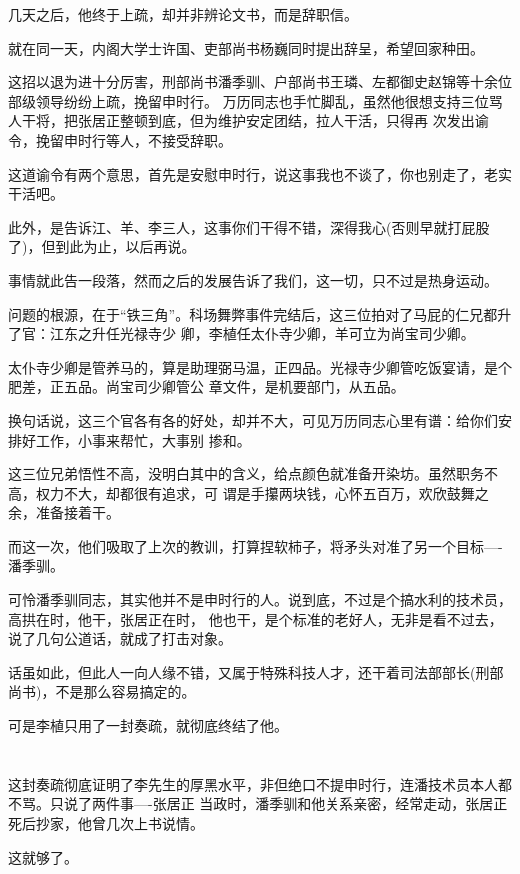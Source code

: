 \documentclass[11pt,a4paper,onecolumn]{article}
\begin{document}
几天之后，他终于上疏，却并非辨论文书，而是辞职信。

就在同一天，内阁大学士许国、吏部尚书杨巍同时提出辞呈，希望回家种田。

这招以退为进十分厉害，刑部尚书潘季驯、户部尚书王璘、左都御史赵锦等十余位部级领导纷纷上疏，挽留申时行。
万历同志也手忙脚乱，虽然他很想支持三位骂人干将，把张居正整顿到底，但为维护安定团结，拉人干活，只得再
次发出谕令，挽留申时行等人，不接受辞职。

这道谕令有两个意思，首先是安慰申时行，说这事我也不谈了，你也别走了，老实干活吧。

此外，是告诉江、羊、李三人，这事你们干得不错，深得我心(否则早就打屁股了)，但到此为止，以后再说。

事情就此告一段落，然而之后的发展告诉了我们，这一切，只不过是热身运动。

问题的根源，在于``铁三角''。科场舞弊事件完结后，这三位拍对了马屁的仁兄都升了官：江东之升任光禄寺少
卿，李植任太仆寺少卿，羊可立为尚宝司少卿。

太仆寺少卿是管养马的，算是助理弼马温，正四品。光禄寺少卿管吃饭宴请，是个肥差，正五品。尚宝司少卿管公
章文件，是机要部门，从五品。

换句话说，这三个官各有各的好处，却并不大，可见万历同志心里有谱：给你们安排好工作，小事来帮忙，大事别
掺和。

这三位兄弟悟性不高，没明白其中的含义，给点颜色就准备开染坊。虽然职务不高，权力不大，却都很有追求，可
谓是手攥两块钱，心怀五百万，欢欣鼓舞之余，准备接着干。

而这一次，他们吸取了上次的教训，打算捏软柿子，将矛头对准了另一个目标----潘季驯。

可怜潘季驯同志，其实他并不是申时行的人。说到底，不过是个搞水利的技术员，高拱在时，他干，张居正在时，
他也干，是个标准的老好人，无非是看不过去，说了几句公道话，就成了打击对象。

话虽如此，但此人一向人缘不错，又属于特殊科技人才，还干着司法部部长(刑部尚书)，不是那么容易搞定的。

可是李植只用了一封奏疏，就彻底终结了他。

\section[\thesection]{}

这封奏疏彻底证明了李先生的厚黑水平，非但绝口不提申时行，连潘技术员本人都不骂。只说了两件事----张居正
当政时，潘季驯和他关系亲密，经常走动，张居正死后抄家，他曾几次上书说情。

这就够了。
\end{document}
